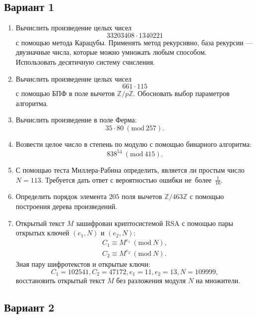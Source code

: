 \documentclass[14pt]{extarticle}
\begin{document}
	\subsection{Вариант 1}
	\begin{enumerate}
		\item Вычислить произведение целых чисел \[33203408 \cdot 1340221\] с помощью метода Карацубы. Применять метод рекурсивно, база рекурсии — двузначные числа, которые можно умножать любым способом.\\ Использовать десятичную систему счисления.
		\item Вычислить произведение целых чисел \[661 \cdot 115\] с помощью БПФ в поле вычетов $\mathbb{Z}/p\mathbb{Z}$. Обосновать выбор параметров алгоритма.
		\item Вычислить произведение в поле Ферма: \[35 \cdot 80\ (\textrm{mod}\ 257).\]
		\item Возвести целое число в степень по модулю с помощью бинарного алгоритма: \[838^{54}\ (\textrm{mod}\ 415).\]
		\item С помощью теста Миллера-Рабина определить, является ли простым число $N = 113$. Требуется дать ответ с вероятностью ошибки не~более~$\frac{1}{16}$.
		\item Определить порядок элемента $205$ поля вычетов $\mathbb{Z}/463\mathbb{Z}$ с помощью построения дерева произведений.
		\item Открытый текст $M$ зашифрован криптосистемой RSA с помощью пары открытых ключей $(e_1, N)$ и $(e_2, N)$:  \[\begin{aligned} C_1 \equiv M^{e_1}\ (\textrm{mod}\ N), \\ C_2 \equiv M^{e_2}\ (\textrm{mod}\ N). \end{aligned}\] Зная пару шифротекстов и открытые ключи: \[C_1 = 102541, C_2 = 47172, e_1 = 11, e_2 = 13, N = 109999,\] восстановить открытый текст $M$ без разложения модуля $N$ на множители.
	\end{enumerate}
\clearpage	\subsection{Вариант 2}
\end{document}
